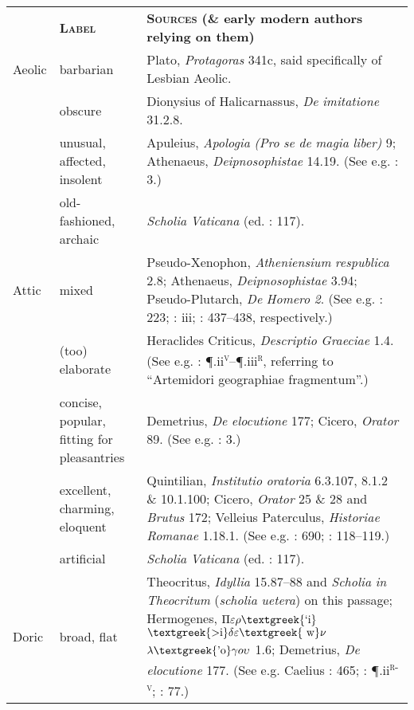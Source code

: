 \tabletail{}
\tablelasttail{}
\begin{tabularx}{\textwidth}{XXX}
\lsptoprule

\multicolumn{1}{X}{\textbf{\textsc{Dialect}}} & \textbf{\textsc{Label}} & \textbf{\textsc{Sources} \textbf{(\&} \textbf{early} \textbf{modern} \textbf{authors} \textbf{relying} \textbf{on} \textbf{them)}}\\
\multicolumn{1}{X}{Aeolic} & barbarian & Plato, \textit{Protagoras} 341c, said specifically of Lesbian Aeolic.\\
& obscure & Dionysius of Halicarnassus, \textit{De} \textit{imitatione} 31.2.8.\\
\hhline{~--} & unusual, affected, insolent & Apuleius, \textit{Apologia} \textit{(Pro} \textit{se} \textit{de} \textit{magia} \textit{liber)} 9; Athenaeus, \textit{Deipnosophistae} 14.19. (See e.g. \citealt{MuntheHeiberg1748}: 3.)\\
\hhline{~--} & old-fashioned, archaic & \textit{Scholia} \textit{Vaticana} (ed. \citealt{Hilgard1901}: 117).\\
\multicolumn{1}{X}{Attic} & mixed & Pseudo-Xenophon, \textit{Atheniensium} \textit{respublica} 2.8; Athenaeus, \textit{Deipnosophistae} 3.94; Pseudo-Plutarch, \textit{De} \textit{Homero} \textit{2}. (See e.g. \citealt{Schwartz1721}: 223; \citealt{Maittaire1706}: iii; \citealt{Saumaise1643a}: 437–438, respectively.)\\
& (too) elaborate & Heraclides Criticus, \textit{Descriptio} \textit{Graeciae} 1.4. (See e.g. \citealt{Estienne1573}: ¶.ii\textsc{\textsuperscript{v}}–¶.iii\textsc{\textsuperscript{r}}, referring to “Artemidori geographiae fragmentum”.)\\
\hhline{~--} & concise, popular, fitting for pleasantries & Demetrius, \textit{De} \textit{elocutione} 177; Cicero, \textit{Orator} 89. (See e.g. \citealt{MuntheHeiberg1748}: 3.)\\
\hhline{~--} & excellent, charming, eloquent & Quintilian, \textit{Institutio} \textit{oratoria} 6.3.107, 8.1.2 \& 10.1.100; Cicero, \textit{Orator} 25 \& 28 and \textit{Brutus} 172; Velleius Paterculus, \textit{Historiae} \textit{Romanae} 1.18.1. (See e.g. \citealt{Duret1613}: 690; \citealt{Rollin1726}: 118–119.)\\
\hhline{~--} & artificial & \textit{Scholia} \textit{Vaticana} (ed. \citealt{Hilgard1901}: 117).\\
\multicolumn{1}{X}{Doric} & broad, flat & Theocritus, \textit{Idyllia} 15.87–88 and \textit{Scholia} \textit{in} \textit{Theocritum} (\textit{scholia} \textit{uetera}) on this passage; Hermogenes, $\Pi \varepsilon \rho \text{\textgreek{`i}}$ $\text{\textgreek{>i}}\delta \varepsilon \text{\textgreek{~w}}\nu $ $\lambda \text{\textgreek{'o}}\gamma o\upsilon $ 1.6; Demetrius, \textit{De} \textit{elocutione} 177. (See e.g. Caelius \citealt{Rhodiginus1542}: 465; \citealt{Estienne1573}: ¶.ii\textsc{\textsuperscript{r-v}}; \citealt{Saumaise1643a}: 77.)\\

\end{tabularx}
